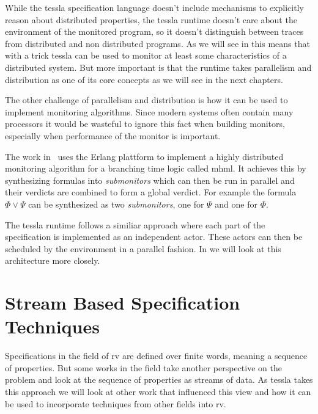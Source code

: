 While the \gls{tessla} specification language doesn't include mechanisms to explicitly reason about distributed properties, the \gls{tessla} runtime doesn't care about the environment of the monitored program, so it doesn't distinguish between traces from distributed and non distributed programs.
As we will see in  this means that with a trick \gls{tessla} can be used to monitor at least some characteristics of a distributed system.
But more important is that the runtime takes parallelism and distribution as one of its core concepts as we will see in the next chapters.

The other challenge of parallelism and distribution is how it can be used to implement monitoring algorithms.
Since modern systems often contain many processors it would be wasteful to ignore this fact when building monitors, especially when performance of the monitor is important.

The work in~\cite{Attard2016} uses the Erlang plattform to implement a highly distributed monitoring algorithm for a branching time logic called \gls{mhml}.
It achieves this by synthesizing formulas into \emph{submonitors} which can then be run in parallel and their verdicts are combined to form a global verdict.
For example the formula \(\Phi \vee \Psi\) can be synthesized as two \emph{submonitors}, one for \(\Psi\) and one for \(\Phi\).

The \gls{tessla} runtime follows a similiar approach where each part of the specification is implemented as an independent actor.
These actors can then be scheduled by the environment in a parallel fashion.
In  we will look at this architecture more closely.

\section{Stream Based Specification Techniques}
\label{sec:related:stream_based}

Specifications in the field of \gls{rv} are defined over finite words, meaning a sequence of properties.
But some works in the field take another perspective on the problem and look at the sequence of properties as streams of data.
As \gls{tessla} takes this approach we will look at other work that influenced this view and how it can be used to incorporate techniques from other fields into \gls{rv}.

\subsection{}
\label{sec:related:stream_based:lola}

